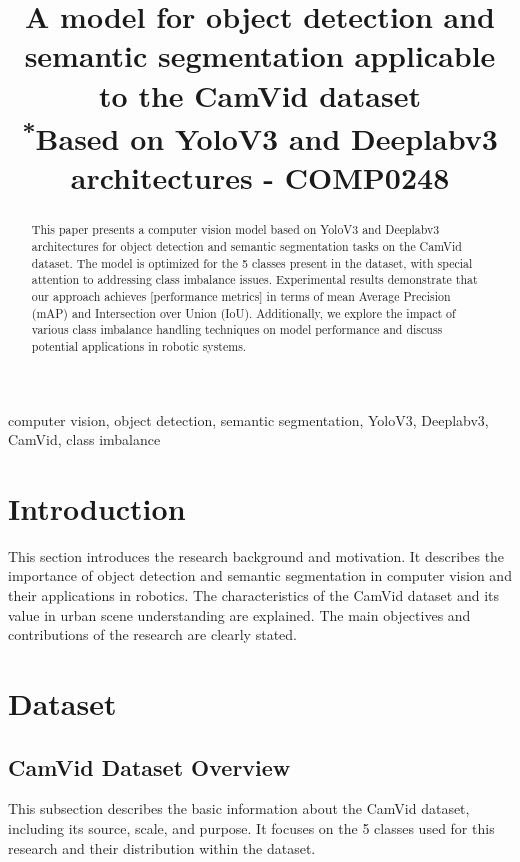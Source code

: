 \documentclass[conference]{IEEEtran}
\begin{document}
\title{A model for object detection and semantic segmentation applicable to the CamVid dataset\\
{\footnotesize \textsuperscript{*}Based on YoloV3 and Deeplabv3 architectures - COMP0248}
}

\author{}

\maketitle

\begin{abstract}
This paper presents a computer vision model based on YoloV3 and Deeplabv3 architectures for object detection and semantic segmentation tasks on the CamVid dataset. The model is optimized for the 5 classes present in the dataset, with special attention to addressing class imbalance issues. Experimental results demonstrate that our approach achieves [performance metrics] in terms of mean Average Precision (mAP) and Intersection over Union (IoU). Additionally, we explore the impact of various class imbalance handling techniques on model performance and discuss potential applications in robotic systems.
\end{abstract}

\begin{IEEEkeywords}
computer vision, object detection, semantic segmentation, YoloV3, Deeplabv3, CamVid, class imbalance
\end{IEEEkeywords}

\section{Introduction}
This section introduces the research background and motivation. It describes the importance of object detection and semantic segmentation in computer vision and their applications in robotics. The characteristics of the CamVid dataset and its value in urban scene understanding are explained. The main objectives and contributions of the research are clearly stated.

\section{Dataset}
\subsection{CamVid Dataset Overview}
This subsection describes the basic information about the CamVid dataset, including its source, scale, and purpose. It focuses on the 5 classes used for this research and their distribution within the dataset.
\end{document}
